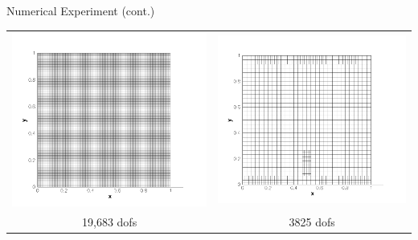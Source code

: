 \documentclass[compress,12pt]{beamer}
\begin{document}
\begin{frame}{Numerical Experiment (cont.)}
    {
      \begin{center}\begin{tabular}{cc} \\
	\includegraphics[width=.5\textwidth]{figures/grid_80x80}&
	\includegraphics[width=.5\textwidth]{figures/grid_adapt_kappa_0_10}\\
	19,683 dofs &
	3825 dofs
      \end{tabular}\end{center}
    }


\end{frame}
\end{document}
